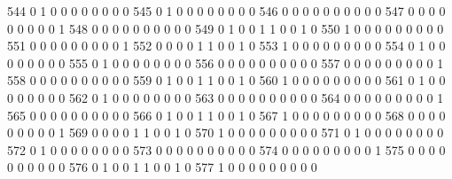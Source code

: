 \documentclass[compress,8pt]{beamer}
\begin{document}
\begin{frame}
\begin{Schunk}
  544      0       1   0              0        0    0       0       0   0   0
  545      0       1   0              0        0    0       0       0   0   0
  546      0       0   0              0        0    0       0       0   0   0
  547      0       0   0              0        0    0       0       0   0   1
  548      0       0   0              0        0    0       0       0   0   0
  549      0       1   0              0        1    1       0       0   1   0
  550      1       0   0              0        0    0       0       0   0   0
  551      0       0   0              0        0    0       0       0   0   1
  552      0       0   0              0        1    1       0       0   1   0
  553      1       0   0              0        0    0       0       0   0   0
  554      0       1   0              0        0    0       0       0   0   0
  555      0       1   0              0        0    0       0       0   0   0
  556      0       0   0              0        0    0       0       0   0   0
  557      0       0   0              0        0    0       0       0   0   1
  558      0       0   0              0        0    0       0       0   0   0
  559      0       1   0              0        1    1       0       0   1   0
  560      1       0   0              0        0    0       0       0   0   0
  561      0       1   0              0        0    0       0       0   0   0
  562      0       1   0              0        0    0       0       0   0   0
  563      0       0   0              0        0    0       0       0   0   0
  564      0       0   0              0        0    0       0       0   0   1
  565      0       0   0              0        0    0       0       0   0   0
  566      0       1   0              0        1    1       0       0   1   0
  567      1       0   0              0        0    0       0       0   0   0
  568      0       0   0              0        0    0       0       0   0   1
  569      0       0   0              0        1    1       0       0   1   0
  570      1       0   0              0        0    0       0       0   0   0
  571      0       1   0              0        0    0       0       0   0   0
  572      0       1   0              0        0    0       0       0   0   0
  573      0       0   0              0        0    0       0       0   0   0
  574      0       0   0              0        0    0       0       0   0   1
  575      0       0   0              0        0    0       0       0   0   0
  576      0       1   0              0        1    1       0       0   1   0
  577      1       0   0              0        0    0       0       0   0   0

\end{Schunk}
\end{frame}
\end{document}
